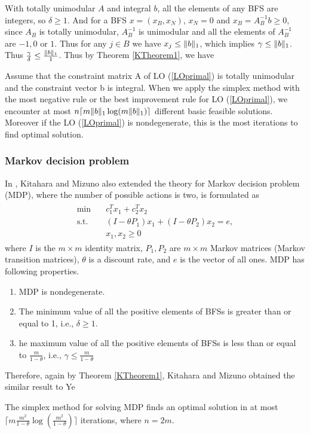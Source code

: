 \documentclass[11pt]{article}
\begin{document}
With totally unimodular $A$ and integral $b$, all the elements of any BFS are integers, so $\delta \ge 1$. And for a BFS $x = (x_B, x_N)$, $x_N = 0$ and $x_B = A_B^{-1}b \ge 0$, since $A_B$ is totally unimodular, $A_B^{-1}$ is unimodular \cite{kitahara2013bound} and all the elements of $A_B^{-1}$ are $-1, 0$ or $1$. Thus for any $j \in B$ we have $x_j \le \lVert b\rVert_1$, which implies $\gamma \le \lVert b\rVert_1$. Thus $\frac{\gamma}{\delta} \le \frac{\lVert b\rVert_1}{1}$. Thus by Theorem \ref{KTheorem1}, we have
\begin{corollary}
Assume that the constraint matrix A of LO (\ref{LOprimal}) is totally unimodular and the constraint vector b is integral. When we apply the simplex method with the most negative rule or the best improvement rule for LO (\ref{LOprimal}), we encounter at most $n\lceil m \lVert b\rVert_1\log(m\lVert b\rVert_1)\rceil$ different basic feasible solutions. Moreover if the LO (\ref{LOprimal}) is nondegenerate, this is the most iterations to find optimal solution. 
\end{corollary}

\subsubsection{Markov decision problem}
In \cite{kitahara2013bound}, Kitahara and Mizuno also extended the theory for Markov decision problem (MDP), where the number of possible actions is two, is formulated as
\begin{align}
\begin{split}
\min \quad &c_1^Tx_1 + c_2^Tx_2 \\
\text{s.t. } \quad &(I-\theta P_1)x_1 + (I - \theta P_2)x_2 = e, \\
&x_1, x_2 \ge 0
\end{split}
\end{align}
where $I$ is the $m \times m$ identity matrix, $P_1, P_2$ are $m\times m$ Markov matrices (Markov transition matrices), $\theta$ is a discount rate, and $e$ is the vector of all ones. MDP has following properties.
\begin{enumerate}
\item MDP is nondegenerate.
\item The minimum value of all the positive elements of BFSs is greater than or equal to 1, i.e., $\delta \ge 1$.
\item he maximum value of all the positive elements of BFSs is less than or equal to $\frac{m}{1-\theta}$, i.e., $\gamma \le \frac{m}{1-\theta}$
\end{enumerate}
Therefore, again by Theorem \ref{KTheorem1}, Kitahara and Mizuno \cite{kitahara2013bound} obtained the similar result to Ye \cite{ye2010simplex}
\begin{corollary}
 The simplex method for solving MDP finds an optimal solution in at most $\lceil m \frac{m^2}{1-\theta}\log(\frac{m^2}{1-\theta})\rceil$ iterations, where $n=2m$.
\end{corollary}
\end{document}
